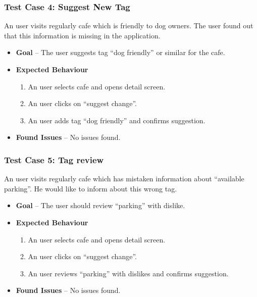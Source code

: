 \subsubsection{Test Case 4: Suggest New Tag}
An user visits regularly cafe which is friendly to dog owners. The user found out that this information is missing in the application. 
\begin{itemize}
    \item \textbf{Goal} -- The user suggests tag ``dog friendly'' or similar for the cafe. 
    \item \textbf{Expected Behaviour}
    \begin{enumerate}
        \item An user selects cafe and opens detail screen.
        \item An user clicks on ``suggest change''.
        \item An user adds tag ``dog friendly'' and confirms suggestion.
    \end{enumerate}
    \item \textbf{Found Issues} -- No issues found.
\end{itemize}
\subsubsection{Test Case 5: Tag review}
An user visits regularly cafe which has mistaken information about ``available parking''. He would like to inform about this wrong tag. 
\begin{itemize}
    \item \textbf{Goal} -- The user should review ``parking'' with dislike. 
    \item \textbf{Expected Behaviour}
    \begin{enumerate}
        \item An user selects cafe and opens detail screen.
        \item An user clicks on ``suggest change''.
        \item An user reviews ``parking'' with dislikes and confirms suggestion. 
    \end{enumerate}
    \item \textbf{Found Issues} -- No issues found.
\end{itemize}
